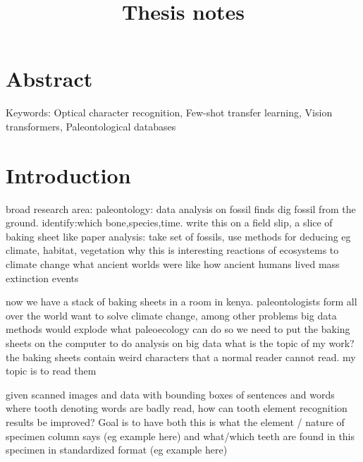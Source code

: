 \documentclass{article}
\title{Thesis notes}
\begin{document}
\tableofcontents

\section{Abstract}

Keywords: Optical character recognition, Few-shot transfer learning, Vision transformers, Paleontological databases

\section{Introduction}
 

broad research area: paleontology: data analysis on fossil finds
dig fossil from the ground. identify:which bone,species,time. write this on a field slip, a slice of
baking sheet like paper 
analysis: take set of fossils, use methods for deducing eg climate, habitat, vegetation
why this is interesting 
    reactions of ecosystems to climate change
    what ancient worlds were like 
    how ancient humans lived
    mass extinction events

now we have a stack of baking sheets in a room in kenya.
paleontologists form all over the world want to solve climate change, among other problems
big data methods would explode what paleoecology can do
so we need to put the baking sheets on the computer to do analysis on big data
what is the topic of my work?
the baking sheets contain weird characters that a normal reader cannot read.
my topic is to read them

given scanned images and data with bounding boxes of sentences and words where tooth denoting words are 
badly read, how can tooth element recognition results be improved? Goal is to have both this is what the element 
/ nature of specimen column says (eg example here) and what/which teeth are found in this specimen in standardized format
(eg example here)


\end{document}
